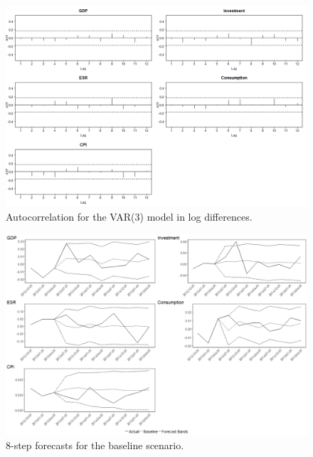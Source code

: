 \begin{figure}[h]
	\centering
		\includegraphics[width=1\textwidth,height=1\textheight,keepaspectratio]{acfplot.png}
	\caption{Autocorrelation for the VAR(3) model in log differences.}
	\label{fig:autocorr_diff}
\end{figure}





\begin{figure}[ht]
	\centering
		\includegraphics[width=1\textwidth,height=1\textheight,keepaspectratio]{basefcst.png}
	\caption{8-step forecasts for the baseline scenario.}
	\label{fig:baseline_comp_diff}
\end{figure}

